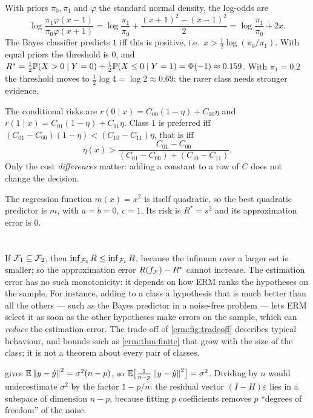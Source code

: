 With priors $\pi_0,\pi_1$ and $\varphi$ the standard normal density, the
log-odds are
\[
  \log\frac{\pi_1\varphi(x-1)}{\pi_0\varphi(x+1)} = \log\frac{\pi_1}{\pi_0} + \frac{(x+1)^2 - (x-1)^2}{2} = \log\frac{\pi_1}{\pi_0} + 2x .
\]
The Bayes classifier predicts $1$ iff this is positive, i.e.\
$x > \frac12\log(\pi_0/\pi_1)$. With equal priors the threshold is $0$, and
$R^* = \frac12\mathbb{P}(X>0\mid Y=0) + \frac12\mathbb{P}(X\leq0\mid Y=1) = \Phi(-1)\approx0.159$.
With $\pi_1 = 0.2$ the threshold moves to $\frac12\log4 = \log2\approx0.69$: the
rarer class needs stronger evidence.

The conditional risks are $r(0\mid x) = C_{00}(1-\eta) + C_{10}\eta$ and
$r(1\mid x) = C_{01}(1-\eta) + C_{11}\eta$. Class $1$ is preferred iff
$(C_{01} - C_{00})(1-\eta) < (C_{10} - C_{11})\eta$, that is iff
\[
  \eta(x) > \frac{C_{01} - C_{00}}{(C_{01} - C_{00}) + (C_{10} - C_{11})} .
\]
Only the cost \emph{differences} matter: adding a constant to a row of $C$ does
not change the decision.

The regression function $m(x) = x^2$ is itself quadratic, so the best quadratic
predictor is $m$, with $a = b = 0$, $c = 1$. Its risk is $R^* = s^2$ and its
approximation error is $0$.

\section{\nameref*{ch:erm}}

If $\mathcal{F}_1\subseteq\mathcal{F}_2$, then $\inf_{\mathcal{F}_2}R\leq\inf_{\mathcal{F}_1}R$, because
the infimum over a larger set is smaller; so the approximation error
$R(f_{\mathcal{F}}) - R^*$ cannot increase. The estimation error has no such
monotonicity: it depends on how ERM ranks the hypotheses on the sample. For
instance, adding to a class a hypothesis that is much better than all the others
--- such as the Bayes predictor in a noise-free problem --- lets ERM select it
as soon as the other hypotheses make errors on the sample, which can
\emph{reduce} the estimation error. The trade-off of \cref{erm:fig:tradeoff}
describes typical behaviour, and bounds such as \cref{erm:thm:finite} that grow
with the size of the class; it is not a theorem about every pair of classes.

 gives $\mathbb{E}\left\|y - \hat y\right\|^2 = \sigma^2(n-p)$, so
$\mathbb{E}\bigl[\frac1{n-p}\left\|y-\hat y\right\|^2\bigr] = \sigma^2$. Dividing by $n$ would
underestimate $\sigma^2$ by the factor $1 - p/n$: the residual vector
$(I-H)\varepsilon$ lies in a subspace of dimension $n-p$, because fitting $p$
coefficients removes $p$ ``degrees of freedom'' of the noise.

